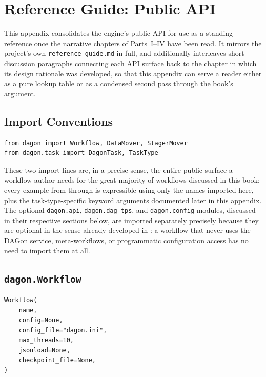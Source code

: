 \chapter{Reference Guide: Public API}
\label{app:reference}

This appendix consolidates the engine's public API for use as a standing
reference once the narrative chapters of Parts~I--IV have been read. It
mirrors the project's own \texttt{reference\_guide.md} in full, and
additionally interleaves short discussion paragraphs connecting each API
surface back to the chapter in which its design rationale was developed, so
that this appendix can serve a reader either as a pure lookup table or as a
condensed second pass through the book's argument.

\section{Import Conventions}

\begin{lstlisting}
from dagon import Workflow, DataMover, StagerMover
from dagon.task import DagonTask, TaskType
\end{lstlisting}

These two import lines are, in a precise sense, the entire public surface a
workflow author needs for the great majority of workflows discussed in this
book: every example from  through
 is expressible using only the names imported here,
plus the task-type-specific keyword arguments documented later in this
appendix. The optional \texttt{dagon.api}, \texttt{dagon.dag\_tps}, and
\texttt{dagon.config} modules, discussed in their respective sections below,
are imported separately precisely because they are optional in the sense
already developed in : a workflow that never uses
the DAGon service, meta-workflows, or programmatic configuration access has
no need to import them at all.

\section{\texttt{dagon.Workflow}}

\begin{lstlisting}[caption={Constructor signature.}]
Workflow(
    name,
    config=None,
    config_file="dagon.ini",
    max_threads=10,
    jsonload=None,
    checkpoint_file=None,
)
\end{lstlisting}

